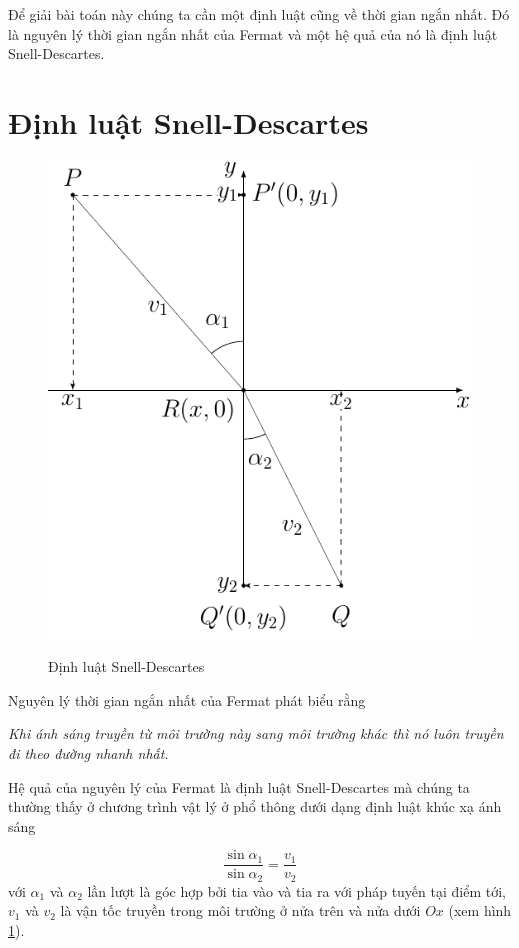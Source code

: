 \documentclass{article}
\begin{document}
Để giải bài toán này chúng ta cần một định luật cũng về thời gian ngắn nhất. Đó là nguyên lý thời gian ngắn nhất của Fermat và một hệ quả của nó là định luật Snell-Descartes.

\section{Định luật Snell-Descartes}

\begin{figure}[ht]
	\centering
	\includegraphics{fermat.pdf}
	\label{snell}
	\caption{Định luật Snell-Descartes}
\end{figure}


Nguyên lý thời gian ngắn nhất của Fermat phát biểu rằng

\textit{Khi ánh sáng truyền từ môi trường này sang môi trường khác thì nó luôn truyền đi theo đường nhanh nhất.}

Hệ quả của nguyên lý của Fermat là định luật Snell-Descartes mà chúng ta thường thấy ở chương trình vật lý ở phổ thông dưới dạng định luật khúc xạ ánh sáng

\begin{equation}
	\frac{\sin \alpha_1}{\sin \alpha_2} = \frac{v_1}{v_2}
\end{equation}
với $\alpha_1$ và $\alpha_2$ lần lượt là góc hợp bởi tia vào và tia ra với pháp tuyến tại điểm tới, $v_1$ và $v_2$ là vận tốc truyền trong môi trường ở nửa trên và nửa dưới $Ox$ (xem hình \ref{snell}).
\end{document}
